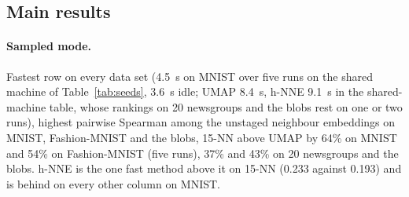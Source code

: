 \documentclass[11pt]{article}
\newcommand{\magnet}{\textsc{magnet}}
\begin{document}
\subsection{Main results}
\begin{table}[t]
\centering\small
\caption{MNIST 70k $\times$ 784, mean over 2 runs (seeded where the method is seeded), defaults for
every method, best per column in bold; shared machine.}
\label{tab:mnist}
\resizebox{\textwidth}{!}{}
\end{table}
\begin{table}[t]
\centering\small
\caption{Fashion-MNIST 70k (1 run).}\label{tab:fmnist}
\resizebox{\textwidth}{!}{}
\end{table}
\begin{table}[t]
\centering\small
\caption{20 newsgroups (18.8k $\times$ 300 SVD; fitting geometry per method as in Sec.~\ref{sec:exp},
euclidean evaluation on the SVD rows; 2 runs).}\label{tab:news20}
\resizebox{\textwidth}{!}{}
\end{table}
\begin{table}[t]
\centering\small
\caption{15 Gaussian blobs (10k $\times$ 200, 2 runs).}\label{tab:blobs}

\end{table}
\begin{table}[t]
\centering\small
\caption{Five independent runs of the decisive rows (\texttt{seeds.py}; \magnet{},
openTSNE, PaCMAP and scikit-learn seeded 0--4; UMAP unseeded, as seeding it serialises its layout). The
baseline rows ran on an idle machine; the \magnet{} rows were re-run after the optimisation pass and the
box-width change of Appendix~\ref{app:impl} with a training job sharing the machine (the SGD row, whose
code did not change, went from 3.6 to 4.5~s; UMAP control runs 9.8--11.8~s against 8.4 idle), so their
times are upper bounds.
Mean $\pm$ standard deviation over the five runs (embedding-run variability only; the evaluation
samples are fixed; values below 0.0005 are shown as 0.000); the dispersion of the mean is that divided
by $\sqrt{5}$. Centroids: Spearman of the 45 inter-centroid distances.}
\label{tab:seeds}
\resizebox{\textwidth}{!}{}
\end{table}

\paragraph{Sampled mode.} Fastest row on every data set (4.5~s on MNIST over five runs on the shared
machine of Table~\ref{tab:seeds}, 3.6~s idle; UMAP 8.4~s,
h-NNE 9.1~s in the shared-machine table, whose rankings on 20 newsgroups and the blobs rest on one or
two runs), highest pairwise Spearman among the unstaged neighbour embeddings on MNIST, Fashion-MNIST and
the blobs,
15-NN above UMAP by 64\% on MNIST and 54\% on Fashion-MNIST (five runs), 37\% and 43\% on 20 newsgroups
and the blobs. h-NNE is the one fast method above
it on 15-NN (0.233 against 0.193) and is behind on every other column on MNIST.
\end{document}
